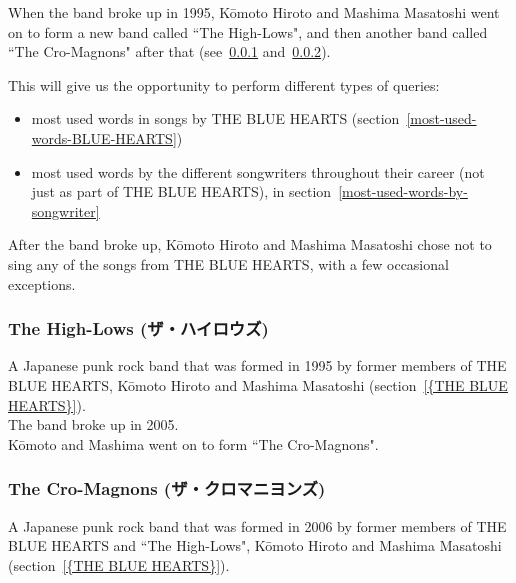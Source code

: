 \bigskip


When the band broke up in 1995, Kōmoto Hiroto and Mashima Masatoshi went on to form a new band called ``The High-Lows", and then another band called ``The Cro-Magnons" after that (see~\ref{the-high-lows} and~\ref{the-cro-magnons}). \\


\bigskip

This will give us the opportunity to perform different types of queries:
\begin{itemize}
	\item most used words in songs by THE BLUE HEARTS (section~\ref{most-used-words-BLUE-HEARTS})
	
	\item most used words by the different songwriters throughout their career (not just as part of THE BLUE HEARTS), in section~\ref{most-used-words-by-songwriter}
\end{itemize}


\bigskip

After the band broke up, Kōmoto Hiroto and Mashima Masatoshi chose not to sing any of the songs from THE BLUE HEARTS, with a few occasional exceptions. \\

\bigskip

\subsubsection{The High-Lows (ザ・ハイロウズ)} \label{the-high-lows}

A Japanese punk rock band that was formed in 1995 by former members of THE BLUE HEARTS, Kōmoto Hiroto and Mashima Masatoshi (section~\ref{{THE BLUE HEARTS}}). \\

The band broke up in 2005. \\

Kōmoto and Mashima went on to form ``The Cro-Magnons".


\bigskip

\subsubsection{The Cro-Magnons (ザ・クロマニヨンズ)} \label{the-cro-magnons}

A Japanese punk rock band that was formed in 2006 by former members of THE BLUE HEARTS and ``The High-Lows", Kōmoto Hiroto and Mashima Masatoshi (section~\ref{{THE BLUE HEARTS}}). \\


